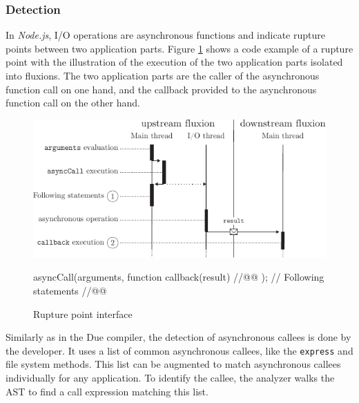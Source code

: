 

\subsubsection{Detection}

In \textit{Node.js}, I/O operations are asynchronous functions and indicate rupture points between two application parts.
Figure \ref{fig:basicrp} shows a code example of a rupture point with the illustration of the execution of the two application parts isolated into fluxions.
The two application parts are the caller of the asynchronous function call on one hand, and the callback provided to the asynchronous function call on the other hand.

\begin{figure}[h!]
  \includegraphics[width=0.8\linewidth]{../resources/basicrp.pdf}
  \begin{code}
asyncCall(arguments, function callback(result){ //@@ });
// Following statements //@@
  \end{code}
  \caption{Rupture point interface}
  \label{fig:basicrp}
\end{figure}

Similarly as in the Due compiler, the detection of asynchronous callees is done by the developer. 
It uses a list of common asynchronous callees, like the \texttt{express} and file system methods.
This list can be augmented to match asynchronous callees individually for any application.
To identify the callee, the analyzer walks the AST to find a call expression matching this list.

